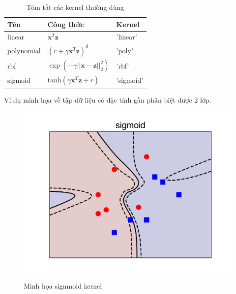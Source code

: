 \documentclass[a4paper, 12pt, oneside]{report}
\begin{document}
\begin{table}[H]
\begin{center}
\begin{tabular}{|l|l|l|}
\hline
Tên & Công thức & Kernel \\
\hline 
linear & $\mathbf{x}^T\mathbf{z}$ & 'linear'\\ 
\hline 
polynomial & $(r + \gamma \mathbf{x}^T\mathbf{z})^d $& 'poly'\\ 
\hline 
rbf & $\exp(-\gamma ||\mathbf{x} - \mathbf{z}||_2^2)$& 'rbf'\\ 
\hline 
sigmoid & 	$\text{tanh}(\gamma \mathbf{x}^T\mathbf{z} + r)$ & 'sigmoid'\\ 
\hline
\end{tabular}
\end{center}
\caption{Tóm tắt các kernel thường dùng}
\label{bang 2.1}
\end{table}
Ví dụ minh họa về tập dữ liệu có đặc tính gần phân biệt được 2 lớp.
\begin{center}
    \begin{figure}[H]
    \begin{center}
     \includegraphics[scale=0.1]{kn1}
    \end{center}
    \caption{Minh họa signmoid kernel}
    \label{refhinh1}
    \end{figure}
\end{center}
\end{document}
